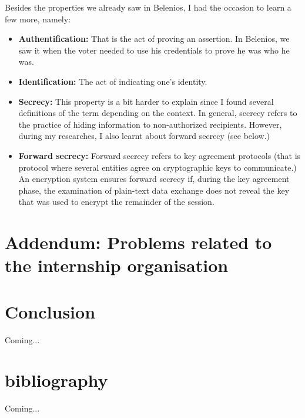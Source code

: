 \documentclass[12pt, a4paper]{report}
\begin{document}
Besides the properties we already saw in Belenios, I had the occasion to learn a few more, namely:

\begin{itemize}
\item \textbf{Authentification:} That is the act of proving an assertion. In Belenios, we saw it when the voter needed to use his credentials to prove he was who he was.

\item \textbf{Identification:} The act of indicating one's identity. 

\item \textbf{Secrecy:} This property is a bit harder to explain since I found several definitions of the term depending on the context. In general, secrecy refers to the practice of hiding information to non-authorized recipients. However, during my researches, I also learnt about forward secrecy (see below.)

\item \textbf{Forward secrecy:} Forward secrecy refers to key agreement protocols (that is protocol where several entities agree on cryptographic keys to communicate.) An encryption system ensures forward secrecy if, during the key agreement phase, the examination of plain-text data exchange does not reveal the key that was used to encrypt the remainder of the session.

\end{itemize}

\section{Addendum: Problems related to the internship organisation}

\section{Conclusion}

Coming...

\section{bibliography}


Coming...
\end{document}
